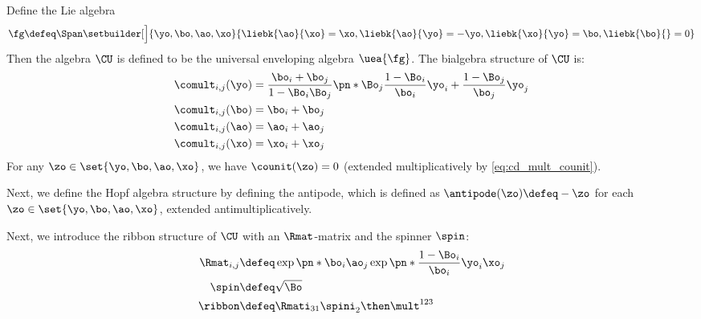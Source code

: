 \begin{definition}
Define the Lie algebra
\begin{equation}
\fg \defeq \Span\setbuilder[\Big]{\yo, \bo, \ao, \xo}{
        \liebk{\ao}{\xo} = \xo,
        \liebk{\ao}{\yo} = -\yo,
        \liebk{\xo}{\yo} = \bo,
        \liebk{\bo}{ } = 0
}
\end{equation}
Then the algebra $\CU$ is defined to be the universal enveloping algebra
$\uea{\fg}$. The bialgebra structure of $\CU$ is: \begin{equation}\begin{aligned}
        \comult_{i,j}(\yo) &=
        \frac{\bo_i+\bo_j}{1-\Bo_i\Bo_j} \pn*{
                \Bo_j\frac{1-\Bo_i}{\bo_i}\yo_i+
                \frac{1-\Bo_j}{\bo_j}\yo_j
        }\\
        \comult_{i,j}(\bo) &= \bo_i + \bo_j\\
        \comult_{i,j}(\ao) &= \ao_i + \ao_j\\
        \comult_{i,j}(\xo) &= \xo_i + \xo_j\\
\end{aligned}\end{equation}
For any $\zo\in\set{\yo, \bo, \ao, \xo}$, we have $\counit(\zo)=0$ (extended
multiplicatively by \cref{eq:cd_mult_counit}).

Next, we define the Hopf algebra structure by defining the antipode, which is
defined as $\antipode(\zo) \defeq -\zo$ for each
$\zo\in\set{\yo, \bo, \ao, \xo}$, extended antimultiplicatively.

Next, we introduce the ribbon structure of $\CU$ with an $\Rmat$-matrix and
the spinner $\spin$:
\begin{align}
        \Rmat_{i,j}
                &\defeq \exp\pn*{\bo_i\ao_j}
                        \exp\pn*{\frac{1-\Bo_i}{\bo_i}\yo_i\xo_j}\\
        \spin &\defeq \sqrt{\Bo}\\
        \ribbon &\defeq \Rmati_{31}\spini_{2} \then \mult^{123}
\end{align}
\end{definition}

